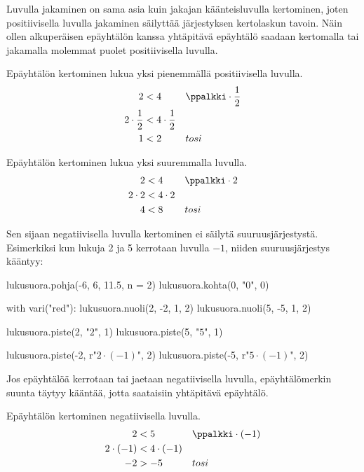 Luvulla jakaminen on sama asia kuin jakajan käänteisluvulla kertominen, joten positiivisella luvulla jakaminen säilyttää järjestyksen kertolaskun tavoin. Näin ollen alkuperäisen epäyhtälön kanssa yhtäpitävä epäyhtälö saadaan kertomalla tai jakamalla molemmat puolet positiivisella luvulla.

\begin{esimerkki}
Epäyhtälön kertominen lukua yksi pienemmällä positiivisella luvulla.
\begin{align*}
     2 &< 4 && \ppalkki \cdot \frac{1}{2} \\
   2\cdot\frac{1}{2} &< 4\cdot\frac{1}{2}  \\
     1 &< 2 && tosi
\end{align*}
\end{esimerkki}

\begin{esimerkki}
Epäyhtälön kertominen lukua yksi suuremmalla luvulla.
\begin{align*}
     2 &< 4 && \ppalkki \cdot 2 \\
   2\cdot 2 &< 4\cdot 2  \\
     4 &< 8 && tosi
\end{align*}
\end{esimerkki}

Sen sijaan negatiivisella luvulla kertominen ei säilytä suuruusjärjestystä. Esimerkiksi kun lukuja 2 ja 5 kerrotaan luvulla $-1$, niiden suuruusjärjestys kääntyy:

\begin{kuva}
lukusuora.pohja(-6, 6, 11.5, n = 2)
lukusuora.kohta(0, "$0$", 0)

with vari("red"):
	lukusuora.nuoli(2, -2, 1, 2)
	lukusuora.nuoli(5, -5, 1, 2)

lukusuora.piste(2, "$2$", 1)
lukusuora.piste(5, "$5$", 1)

lukusuora.piste(-2, r"$2 \cdot (-1)$", 2)
lukusuora.piste(-5, r"$5 \cdot (-1)$", 2)
\end{kuva}

Jos epäyhtälöä kerrotaan tai jaetaan negatiivisella luvulla, epäyhtälömerkin suunta täytyy kääntää, jotta saataisiin yhtäpitävä epäyhtälö.

\begin{esimerkki}
Epäyhtälön kertominen negatiivisella luvulla.
\begin{align*}
     2 &< 5 && \ppalkki \cdot (-1) \\
   2\cdot (-1) &< 4\cdot (-1)  \\
     -2 &> -5 && tosi
\end{align*}
\end{esimerkki}

